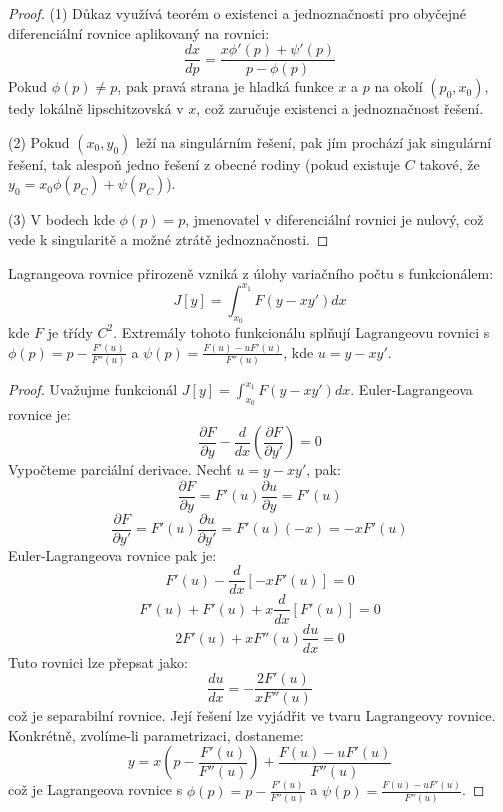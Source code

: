 \begin{proof}
(1) Důkaz využívá teorém o existenci a jednoznačnosti pro obyčejné diferenciální rovnice aplikovaný na rovnici:
\[
\frac{dx}{dp} = \frac{x\phi'(p) + \psi'(p)}{p - \phi(p)}
\]
Pokud $\phi(p) \neq p$, pak pravá strana je hladká funkce $x$ a $p$ na okolí $(p_0, x_0)$, tedy lokálně lipschitzovská v $x$, což zaručuje existenci a jednoznačnost řešení.

(2) Pokud $(x_0, y_0)$ leží na singulárním řešení, pak jím prochází jak singulární řešení, tak alespoň jedno řešení z obecné rodiny (pokud existuje $C$ takové, že $y_0 = x_0\phi(p_C) + \psi(p_C)$).

(3) V bodech kde $\phi(p) = p$, jmenovatel v diferenciální rovnici je nulový, což vede k singularitě a možné ztrátě jednoznačnosti.
\end{proof}

\begin{theorem}
Lagrangeova rovnice přirozeně vzniká z úlohy variačního počtu s funkcionálem:
\[
J[y] = \int_{x_0}^{x_1} F(y - xy') dx
\]
kde $F$ je třídy $C^2$. Extremály tohoto funkcionálu splňují Lagrangeovu rovnici s $\phi(p) = p - \frac{F'(u)}{F''(u)}$ a $\psi(p) = \frac{F(u) - uF'(u)}{F''(u)}$, kde $u = y - xy'$.
\end{theorem}

\begin{proof}
Uvažujme funkcionál $J[y] = \int_{x_0}^{x_1} F(y - xy') dx$. Euler-Lagrangeova rovnice je:
\[
\frac{\partial F}{\partial y} - \frac{d}{dx}\left(\frac{\partial F}{\partial y'}\right) = 0
\]
Vypočteme parciální derivace. Nechť $u = y - xy'$, pak:
\[
\frac{\partial F}{\partial y} = F'(u)\frac{\partial u}{\partial y} = F'(u)
\]
\[
\frac{\partial F}{\partial y'} = F'(u)\frac{\partial u}{\partial y'} = F'(u)(-x) = -xF'(u)
\]
Euler-Lagrangeova rovnice pak je:
\[
F'(u) - \frac{d}{dx}[-xF'(u)] = 0
\]
\[
F'(u) + F'(u) + x\frac{d}{dx}[F'(u)] = 0
\]
\[
2F'(u) + xF''(u)\frac{du}{dx} = 0
\]
Tuto rovnici lze přepsat jako:
\[
\frac{du}{dx} = -\frac{2F'(u)}{xF''(u)}
\]
což je separabilní rovnice. Její řešení lze vyjádřit ve tvaru Lagrangeovy rovnice. Konkrétně, zvolíme-li parametrizaci, dostaneme:
\[
y = x\left(p - \frac{F'(u)}{F''(u)}\right) + \frac{F(u) - uF'(u)}{F''(u)}
\]
což je Lagrangeova rovnice s $\phi(p) = p - \frac{F'(u)}{F''(u)}$ a $\psi(p) = \frac{F(u) - uF'(u)}{F''(u)}$.
\end{proof}

\vspace{1\baselineskip}

